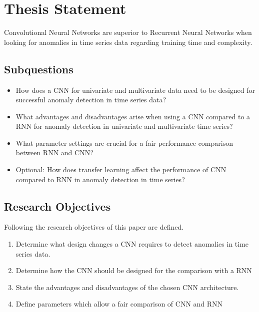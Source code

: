 
\section{Thesis Statement}

Convolutional Neural Networks are superior to Recurrent Neural Networks when looking for anomalies in time series data regarding training time and complexity.

\subsection{Subquestions}

\begin{itemize}
	\item How does a CNN for univariate and multivariate data need to be designed for successful anomaly detection in time series data?
	\item What advantages and disadvantages arise when using a CNN compared to a RNN for anomaly detection in univariate and multivariate time series?
	\item What parameter settings are crucial for a fair performance comparison between RNN and CNN? 
	\item Optional: How does transfer learning affect the performance of CNN compared to RNN in anomaly detection in time series?
\end{itemize}

 
\subsection{Research Objectives}

Following the research objectives of this paper are defined.


\begin{enumerate}
	\item Determine what design changes a CNN requires to detect anomalies in time series data.
	\item Determine how the CNN should be designed for the comparison with a RNN
	\item State the advantages and disadvantages of the chosen CNN architecture.
	\item Define parameters which allow a fair comparison of CNN and RNN
\end{enumerate}

